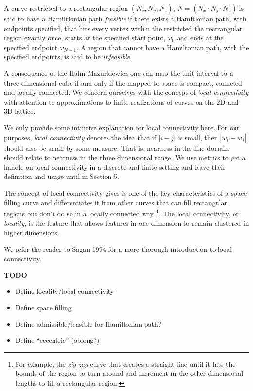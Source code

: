 A curve restricted to a rectangular region $( N _ x, N _ y, N _ z)$,  $N = (N _ x \cdot N _ y \cdot N _ z)$
is said to have a Hamiltionian path \textit{feasible} if there exists a Hamitlonian path, with endpoints specified,
that hits every vertex within the restricted the rectrangular region exactly once, starts at the specified start
point, $\omega_0$ and ends at the specified endpoint $\omega_{N-1}$.
A region that cannot have a Hamiltonian path, with the specified endpoints, is said to be \textit{infeasible}.

A consequence of the Hahn-Mazurkiewicz \cite{sagan_1994} one can map the unit interval to a three dimensional
cube if and only if the mapped to space is compact, conneted and locally connected.
We concern ourselves with the concept of \textit{local connectivity} with attention to approximations
to finite realizations of curves on the 2D and 3D lattice.

We only provide some intuitive explanation for local connectivity here.
For our purposes, \textit{local connectivity} denotes the idea that if $|i-j|$ is small, then $|w_i - w_j|$
should also be small by some measure.
That is, nearness in the line domain should relate to nearness in the three dimensional range.
We use metrics to get a handle on local connectivity in a discrete and finite setting and leave
their definition and usage until in Section 5.

The concept of local connectivity gives is one of the key characteristics of a space filling curve
and differentiates it from other curves that can fill rectangular regions but don't do so in a
locally connected way \footnote{For example, the \textit{zig-zag} curve that creates a straight line until
it hits the bounds of the region to turn around and increment in the other dimensional lengths to fill 
a rectangular region.}.
The local connectivity, or \textit{locality}, is the feature that allows features in one dimension to
remain clustered in higher dimensions.

We refer the reader to Sagan 1994 \cite{sagan_1994} for a more thorough introduction to local connectivity.






\textbf{TODO}

\begin{itemize}
  \item Define locality/local connectivity
  \item Define space filling
  \item Define admissible/feasible for Hamiltonian path?
  \item Define ``eccentric'' (oblong?)
\end{itemize}


